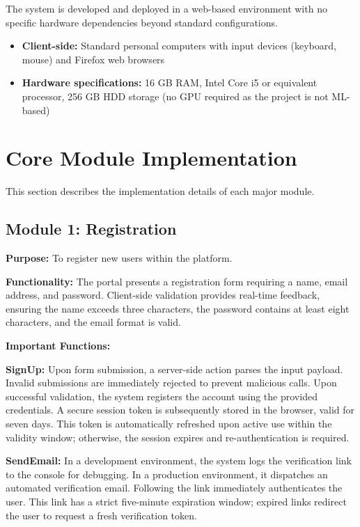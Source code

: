 The system is developed and deployed in a web-based environment with no specific hardware dependencies beyond standard configurations.

\begin{itemize}
\item \textbf{Client-side:} Standard personal computers with input devices (keyboard, mouse) and Firefox web browsers
\item \textbf{Hardware specifications:} 16 GB RAM, Intel Core i5 or equivalent processor, 256 GB HDD storage (no GPU required as the project is not ML-based)
\end{itemize}


\section{Core Module Implementation}

This section describes the implementation details of each major module.

\subsection{Module 1: Registration}

\textbf{Purpose:}
To register new users within the platform.

\textbf{Functionality:}
The portal presents a registration form requiring a name, email address, and password. Client-side validation provides real-time feedback, ensuring the name exceeds three characters, the password contains at least eight characters, and the email format is valid.

\textbf{Important Functions:}

\textbf{SignUp:}
Upon form submission, a server-side action parses the input payload. Invalid submissions are immediately rejected to prevent malicious calls. Upon successful validation, the system registers the account using the provided credentials. A secure session token is subsequently stored in the browser, valid for seven days. This token is automatically refreshed upon active use within the validity window; otherwise, the session expires and re-authentication is required.

\textbf{SendEmail:}
In a development environment, the system logs the verification link to the console for debugging. In a production environment, it dispatches an automated verification email. Following the link immediately authenticates the user. This link has a strict five-minute expiration window; expired links redirect the user to request a fresh verification token.

